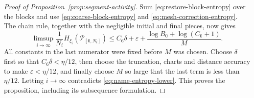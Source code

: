 \begin{proof}[Proof of Proposition~\ref{prop:segment-activity}]
Sum \eqref{eq:restore-block-entropy} over the blocks and use
\eqref{eq:coarse-block-entropy} and \eqref{eq:mesh-correction-entropy}.
The chain rule, together with the negligible initial and final pieces,
now gives
\begin{equation}\label{eq:name-entropy-upper}
 \limsup_{i\to\infty}\frac1{N_i}
 H_{\xi_i}(\mathcal P_{[0,N_i]})
 \leq C_6\delta+\varepsilon+
 \frac{\log B_0+\log(C_0+1)}{M}.
\end{equation}
All constants in the last numerator were fixed before $M$ was chosen.
Choose $\delta$ first so that $C_6\delta<\eta/12$, then choose the
truncation, charts and distance accuracy to make $\varepsilon<\eta/12$,
and finally choose $M$ so large that the last term is less than
$\eta/12$.  Letting $i\to\infty$ contradicts
\eqref{eq:name-entropy-lower}.  This proves the proposition, including its
subsequence formulation.
\end{proof}
